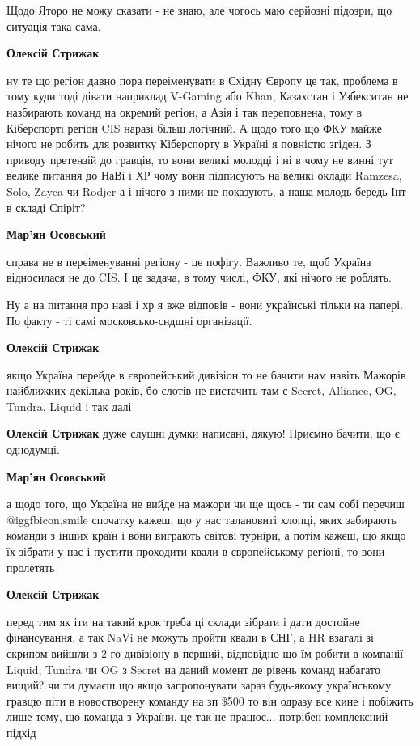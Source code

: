 \begin{itemize}
\begin{itemize}
Щодо Яторо не можу сказати - не знаю, але чогось маю серйозні підозри, що
ситуація така сама.

\begin{itemize} %
\textbf{Олексій Стрижак} 

ну те що регіон давно пора переіменувати в Східну Європу це так, проблема в
тому куди тоді дівати наприклад V-Gaming або Khan, Казахстан і Узбекситан не
назбирають команд на окремий регіон, а Азія і так переповнена, тому в
Кіберспорті регіон CIS наразі більш логічний. А щодо того що ФКУ майже нічого
не робить для розвитку Кіберспорту в Україні я повністю згіден. З приводу
претензій до гравців, то вони великі молодці і ні в чому не винні тут велике
питання до НаВі і ХР чому вони підписують на великі оклади Ramzesa, Solo, Zayca
чи Rodjer-а і нічого з ними не показують, а наша молодь бередь Інт в складі
Спіріт?


\textbf{Мар'ян Осовський} 

справа не в переіменуванні регіону - це пофігу. Важливо те, щоб Україна
відносилася не до CIS. І це задача, в тому числі, ФКУ, які нічого не роблять.

Ну а на питання про наві і хр я вже відповів - вони українські тільки на
папері. По факту - ті самі московсько-сндшні організації.


\textbf{Олексій Стрижак} 

якщо Україна перейде в європейський дивізіон то не бачити нам навіть Мажорів
найближких декілька років, бо слотів не вистачить там є Secret, Alliance, OG,
Tundra, Liquid і так далі

\textbf{Олексій Стрижак} дуже слушні думки написані, дякую! Приємно бачити, що є однодумці.

\textbf{Мар'ян Осовський} 

а щодо того, що Україна не вийде на мажори чи ще щось - ти сам собі перечиш  @igg{fbicon.smile} 
спочатку кажеш, що у нас талановиті хлопці, яких забирають команди з інших
країн і вони виграють світові турніри, а потім кажеш, що якщо їх зібрати у нас
і пустити проходити квали в європейському регіоні, то вони пролетять

\textbf{Олексій Стрижак} 

перед тим як іти на такий крок треба ці склади зібрати і дати достойне
фінансування, а так NaVi не можуть пройти квали в СНГ, а HR взагалі зі скрипом
вийшли з 2-го дивізіону в перший, відповідно що їм робити в компанії Liquid,
Tundra чи OG з Secret на даний момент де рівень команд набагато вищий? чи ти
думаєш що якщо запропонувати зараз будь-якому українському гравцю піти в
новостворену команду на зп \$500 то він одразу все кине і побіжить лише тому, що
команда з України, це так не працює... потрібен комплексний підхід


\end{itemize}
\end{itemize}
\end{itemize}
